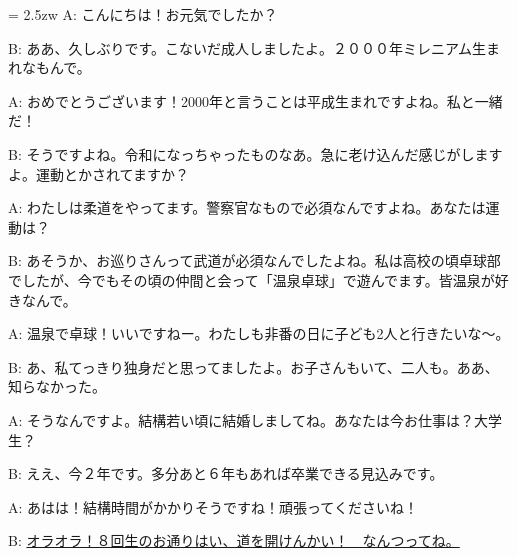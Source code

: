 \documentclass[11pt]{amsart}
\title{}
\author{}
\newenvironment{hangall}[1]{\hangindent = 2.5zw\everypar{\hangindent = 2.5zw}}{}
\begin{document}
\maketitle
\begin{hangall}{}%
A: こんにちは！お元気でしたか？

B: ああ、久しぶりです。こないだ成人しましたよ。２０００年ミレニアム生まれなもんで。

A: おめでとうございます！2000年と言うことは平成生まれですよね。私と一緒だ！

B: そうですよね。令和になっちゃったものなあ。急に老け込んだ感じがしますよ。運動とかされてますか？

A: わたしは柔道をやってます。警察官なもので必須なんですよね。あなたは運動は？

B: あそうか、お巡りさんって武道が必須なんでしたよね。私は高校の頃卓球部でしたが、今でもその頃の仲間と会って「温泉卓球」で遊んでます。皆温泉が好きなんで。

A: 温泉で卓球！いいですねー。わたしも非番の日に子ども2人と行きたいな〜。

B: あ、私てっきり独身だと思ってましたよ。お子さんもいて、二人も。ああ、知らなかった。

A: そうなんですよ。結構若い頃に結婚しましてね。あなたは今お仕事は？大学生？

B: ええ、今２年です。多分あと６年もあれば卒業できる見込みです。

A: あはは！結構時間がかかりそうですね！頑張ってくださいね！

B: \ul{オラオラ！８回生のお通りはい、道を開けんかい！　なんつってね。}\end{hangall}
\end{document}
